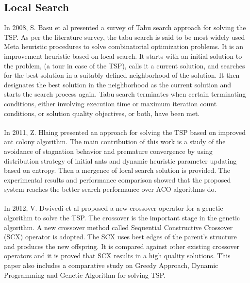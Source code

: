 \subsection{Local Search}
In 2008, S. Basu et al \cite{Basu2008}  presented
a survey of Tabu search approach for solving the TSP. As per the literature survey, the tabu search is said to be most widely used Meta heuristic procedures to solve combinatorial optimization problems. It is an improvement heuristic based on local search. It starts with an initial solution to the problem, (a tour in case of the TSP), calls it a current solution, and searches for the best solution in a suitably defined neighborhood of the solution. It then designates the best solution in the neighborhood as the current solution and starts the search process again. Tabu search terminates when
certain terminating conditions, either involving execution
time or maximum iteration count conditions, or solution
quality objectives, or both, have been met.\\
\\
In 2011, Z. Hlaing \cite{chi2011} presented an approach for solving the TSP based on improved ant colony algorithm. The main contribution of this work is a study of the avoidance of stagnation behavior and premature convergence by using distribution strategy of initial ants and dynamic heuristic parameter updating based on entropy. Then a mergence of local search solution is provided. The experimental results
and performance comparison showed that the proposed system reaches the better search performance over ACO algorithms do.\\
\\
In 2012, V. Dwivedi et al \cite{Dwivedi2012} proposed a new crossover operator for a genetic algorithm to solve the TSP. The crossover is the important stage in the genetic algorithm. A new crossover method called Sequential Constructive Crossover (SCX) operator is adopted. The SCX uses best edges of the parent’s structure and produces the new offspring. It is compared against other existing crossover operators and it is proved that SCX results in a high quality solutions. This paper also includes a comparative study on Greedy Approach, Dynamic Programming and Genetic Algorithm for solving TSP. 


